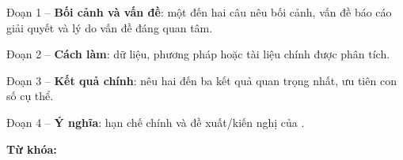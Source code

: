 
Đoạn 1 -- \textbf{Bối cảnh và vấn đề}: một đến hai câu nêu bối cảnh, vấn đề báo cáo
giải quyết và lý do vấn đề đáng quan tâm.

Đoạn 2 -- \textbf{Cách làm}: dữ liệu, phương pháp hoặc tài liệu chính được phân tích.

Đoạn 3 -- \textbf{Kết quả chính}: nêu hai đến ba kết quả quan trọng nhất, ưu tiên con số cụ thể.

Đoạn 4 -- \textbf{Ý nghĩa}: hạn chế chính và đề xuất/kiến nghị của \nhom{}.

\vspace{0.6em}
\noindent\textbf{Từ khóa:} \textit{\TuKhoa}
